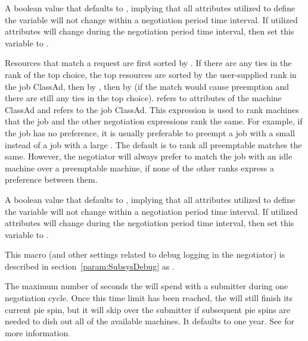 \begin{description}
\label{param:PreemptionRequirementsStable} 
\item[\Macro{PREEMPTION\_REQUIREMENTS\_STABLE}]
  A boolean value that defaults to , implying that all attributes
  utilized to define the  variable will not
  change within a negotiation period time interval.
  If utilized attributes will change during the 
  negotiation period time interval, then set this variable to . 

\label{param:PreemptionRank}
\item[\Macro{PREEMPTION\_RANK}]
  Resources that match a request are first sorted by
  .  If there are any ties in the
  rank of the top choice, the top resources are sorted by the
  user-supplied rank in the job ClassAd, then by
  , then by
   (if the match would cause preemption and
  there are still any ties in the top choice).  \verb@MY@ refers to
  attributes of the machine ClassAd and \verb@TARGET@ refers to the
  job ClassAd.  This expression is used to rank machines that the job
  and the other negotiation expressions rank the same.  For example,
  if the job has no preference, it is usually preferable to preempt a
  job with a small  instead of a job with a large
  .  The default is to rank all preemptable matches
  the same.  However, the negotiator will always prefer to match the
  job with an idle machine over a preemptable machine, if none of the
  other ranks express a preference between them.

\label{param:PreemptionRankStable}
\item[\Macro{PREEMPTION\_RANK\_STABLE}]
  A boolean value that defaults to , implying that all attributes
  utilized to define the  variable will not
  change within a negotiation period time interval.
  If utilized attributes will change during the 
  negotiation period time interval, then set this variable to .

\label{param:NegotiatorDebug}
\item[\Macro{NEGOTIATOR\_DEBUG}]
  This macro (and other settings related to debug logging in the negotiator) is
  described in section~\ref{param:SubsysDebug} as .

\label{param:NegotiatorMaxTimePerSubmitter}
\item[\Macro{NEGOTIATOR\_MAX\_TIME\_PER\_SUBMITTER}]
  The maximum number of seconds
  the  will spend with a submitter during one
  negotiation cycle.  Once this time limit has been reached, the
   will still finish its current pie spin, but it will skip
  over the submitter if subsequent pie spins are needed to dish out all
  of the available machines.  It defaults to one year.  See
   for more information.


\end{description}
